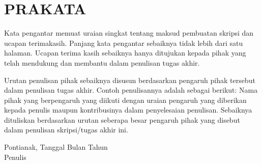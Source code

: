 \chapter*{PRAKATA}
Kata pengantar memuat uraian singkat tentang maksud pembuatan skripsi dan ucapan terimakasih. Panjang kata pengantar sebaiknya tidak lebih dari satu halaman. Ucapan terima kasih sebaiknya hanya ditujukan kepada pihak yang telah mendukung dan membantu dalam penulisan tugas akhir.

Urutan penulisan pihak sebaiknya disusun berdasarkan pengaruh pihak tersebut dalam penulisan tugas akhir. Contoh penulisannya adalah sebagai berikut:
Nama pihak yang berpengaruh yang diikuti dengan uraian pengaruh yang diberikan kepada penulis maupun kontribusinya dalam penyelesaian penulisan. Sebaiknya dituliskan berdasarkan urutan seberapa besar pengaruh pihak yang disebut dalam penulisan skripsi/tugas akhir ini.

\vspace{1cm}
\begin{flushright}
Pontianak, Tanggal Bulan Tahun \\[1.5cm]
Penulis
\end{flushright}
